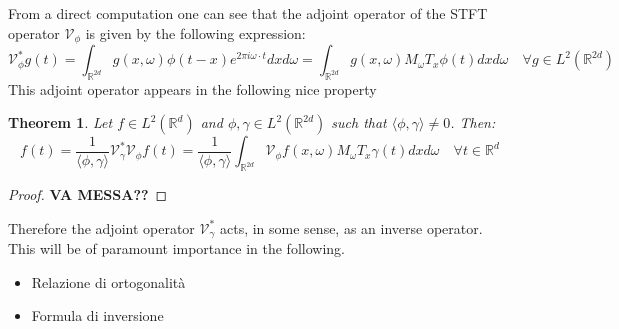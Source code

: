 \documentclass[corpo=11pt, stile=classica, tipotesi=custom,
greek, evenboxes, english]{toptesi}
\numberwithin{equation}{chapter}
\newtheorem{teo}{Theorem}[chapter] %
\theoremstyle{remark}
\newcommand{\R}{\mathbb{R}} %
\newcommand{\V}{\mathcal{V}} %
\begin{document}
From a direct computation one can see that the adjoint operator of the STFT operator $\V_{\phi}$ is given by the following expression:
\begin{equation}\label{STFT adjoint}
	\V_{\phi}^* g(t) = \int_{\R^{2d}} g(x,\omega) \phi(t-x) e^{2 \pi i \omega \cdot t} dxd\omega = \int_{\R^{2d}} g(x,\omega) M_{\omega}T_x \phi (t) dxd\omega\quad \forall g \in L^2(\R^{2d})
\end{equation}
This adjoint operator appears in the following nice property
\begin{teo}\label{inversion formula theorem}
	Let $f \in L^2(\R^d)$ and $\phi, \gamma \in L^2(\R^{2d})$ such that $\langle \phi, \gamma \rangle \neq 0$. Then:
	\begin{equation}\label{inversion formula}
		f(t) = \dfrac{1}{\langle \phi, \gamma \rangle} \V_{\gamma}^* \V_{\phi} f(t) = \dfrac{1}{\langle \phi, \gamma \rangle} \int_{\R^{2d}} \V_{\phi}f(x,\omega)M_{\omega}T_x \gamma (t) dxd\omega \quad \forall t \in \R^d
	\end{equation}
\end{teo}
\begin{proof}
	\textbf{VA MESSA??}
\end{proof}
Therefore the adjoint operator $\V_{\gamma}^*$ acts, in some sense, as an inverse operator. This will be of paramount importance in the following.
\begin{itemize}
	\item Relazione di ortogonalità
	\item Formula di inversione
\end{itemize}
\end{document}
